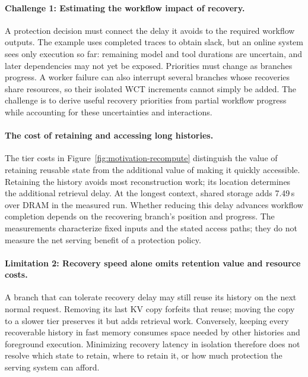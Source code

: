 \paragraph{Challenge 1: Estimating the workflow impact of recovery.}
A protection decision must connect the delay it avoids to the required
workflow outputs. The example uses completed traces to obtain slack,
but an online system sees only execution so far: remaining model and
tool durations are uncertain, and later dependencies may not yet be
exposed. Priorities must change as branches progress. A worker failure
can also interrupt several branches whose recoveries share resources,
so their isolated WCT increments cannot simply be added. The challenge
is to derive useful recovery priorities from partial workflow progress
while accounting for these uncertainties and interactions.

\paragraph{The cost of retaining and accessing long histories.}
\label{sec:motivation-long-context}
The tier costs in Figure~\ref{fig:motivation-recompute} distinguish
the value of retaining reusable state from the additional value of
making it quickly accessible. Retaining the history avoids most
reconstruction work; its location determines the additional retrieval
delay. At the longest context, shared storage adds 7.49\,s over DRAM
in the measured run. Whether reducing this delay advances workflow
completion depends on the recovering branch's position and progress.
The measurements characterize fixed inputs and the stated access paths;
they do not measure the net serving benefit of a protection policy.

\paragraph{Limitation 2: Recovery speed alone omits retention value and
resource costs.}
A branch that can tolerate recovery delay may still reuse its history
on the next normal request. Removing its last KV copy forfeits that reuse;
moving the copy to a slower tier preserves it but adds retrieval work.
Conversely, keeping every recoverable history in fast memory consumes
space needed by other histories and foreground execution. Minimizing
recovery latency in isolation therefore does not resolve which state
to retain, where to retain it, or how much protection the serving system
can afford.

